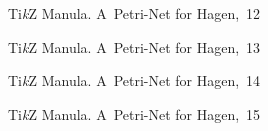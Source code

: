 \documentclass[a4paper,11pt]{article}
\begin{document}
\begin{figure}[ht]

  \centering

  \begin{tikzpicture}



  \end{tikzpicture}

  \caption{Ti\emph{k}Z Manula. A~Petri-Net for Hagen,~12}

\end{figure}





\begin{figure}[ht]

  \centering

  \begin{tikzpicture}



  \end{tikzpicture}

  \caption{Ti\emph{k}Z Manula. A~Petri-Net for Hagen,~13}

\end{figure}





\begin{figure}[ht]

  \centering

  \begin{tikzpicture}



  \end{tikzpicture}

  \caption{Ti\emph{k}Z Manula. A~Petri-Net for Hagen,~14}

\end{figure}





\begin{figure}[ht]

  \centering

  \begin{tikzpicture}



  \end{tikzpicture}

  \caption{Ti\emph{k}Z Manula. A~Petri-Net for Hagen,~15}

\end{figure}
\end{document}
